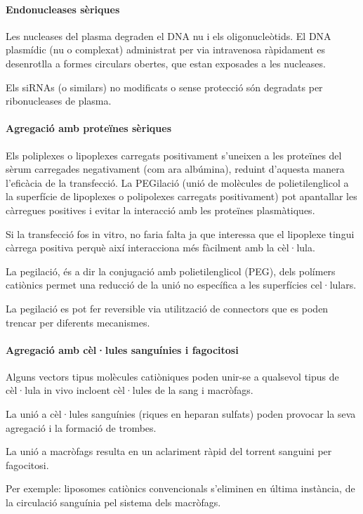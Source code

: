 \paragraph{Endonucleases sèriques}
Les nucleases del plasma degraden el DNA nu i els oligonucleòtids.
El DNA plasmídic (nu o complexat) administrat per via intravenosa ràpidament es desenrotlla a formes circulars obertes, que estan exposades a les nucleases.

Els siRNAs (o similars) no modificats o sense protecció són degradats per ribonucleases de plasma.

\paragraph{Agregació amb proteïnes sèriques}
Els poliplexes o lipoplexes carregats positivament s'uneixen a les proteïnes del sèrum carregades negativament (com ara albúmina), reduint d'aquesta manera l'eficàcia de la transfecció.
La PEGilació (unió de molècules de polietilenglicol a la superfície de lipoplexes o polipolexes carregats positivament) pot apantallar les càrregues positives i evitar la interacció amb les proteïnes plasmàtiques.

Si la transfecció fos in vitro, no faria falta ja que interessa que el lipoplexe tingui càrrega positiva perquè així interacciona més fàcilment amb la cèl·lula.

La pegilació, és a dir la conjugació amb polietilenglicol (PEG), dels polímers catiònics permet una reducció de la unió no específica a les superfícies cel·lulars.

La pegilació es pot fer reversible via utilització de connectors que es poden trencar per diferents mecanismes.

\paragraph{Agregació amb cèl·lules sanguínies i fagocitosi}
Alguns vectors tipus molècules catiòniques poden unir-se a qualsevol tipus de cèl·lula in vivo incloent cèl·lules de la sang i macròfags.

La unió a cèl·lules sanguínies (riques en heparan sulfats) poden provocar la seva agregació i la formació de trombes.

La unió a macròfags resulta en un aclariment ràpid del torrent sanguini per fagocitosi.

Per exemple: liposomes catiònics convencionals s'eliminen en última instància, de la circulació sanguínia pel sistema dels macròfags.

